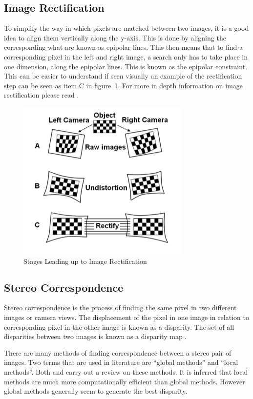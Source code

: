 \documentclass[11pt,oneside]{report}
\begin{document}
				\subsection{Image Rectification}
				 	To simplify the way in which pixels are matched between two images, it is a good idea to align them vertically along the y-axis.
				 	This is done by aligning the corresponding what are known as epipolar lines.
					This then means that to find a corresponding pixel in the left and right image, a search only has to take place in one dimension, along the epipolar lines.
					This is known as the epipolar constraint.
					This can be easier to understand if seen visually an example of the rectification step can be seen as item C in figure~\ref{fig:rect}.
					For more in depth information on image rectification please read .
					\begin{figure}
				\centering
					\includegraphics[scale=0.5]{rect_proc}
					\caption{Stages Leading up to Image Rectification \protect\cite{pap:rect} {\label{fig:rect}}}

				\end{figure}
				
				\subsection{Stereo Correspondence}
					Stereo correspondence is the process of finding the same pixel in two different images or camera views.
					The displacement of the pixel in one image in relation to corresponding pixel in the other image is known as a disparity.
					The set of all disparities between two images is known as a disparity map \cite{journal:matchers}.
					
					There are many methods of finding correspondence between a stereo pair of images.
					Two terms that are used in literature are ``global methods'' and ``local methods''.
					Both  and  carry out a review on these methods.
					It is inferred that local methods are much more computationally efficient than global methods.
					However global methods generally seem to generate the best disparity.
					
\end{document}
